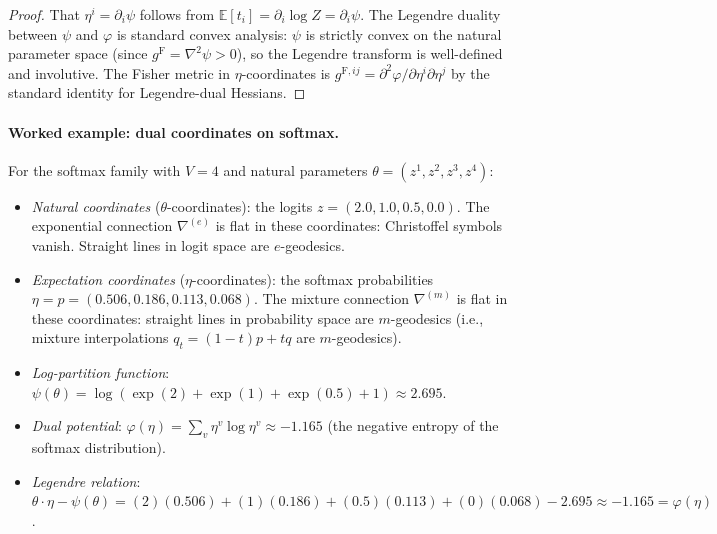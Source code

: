 \documentclass[11pt]{article}
\newcommand{\E}{\mathbb{E}}
\newcommand{\gF}{g^{\mathrm{F}}}
\theoremstyle{remark}
\begin{document}
\begin{proof}
That $\eta^i = \partial_i \psi$ follows from
$\E[t_i] = \partial_i \log Z = \partial_i \psi$.  The Legendre duality between
$\psi$ and $\varphi$ is standard convex analysis: $\psi$ is strictly convex
on the natural parameter space (since $\gF = \nabla^2 \psi > 0$), so the
Legendre transform is well-defined and involutive.  The Fisher metric in
$\eta$-coordinates is $g^{\mathrm{F},ij} = \partial^2 \varphi / \partial\eta^i
\partial\eta^j$ by the standard identity for Legendre-dual Hessians.
\end{proof}

\paragraph{Worked example: dual coordinates on softmax.}
For the softmax family with $V = 4$ and natural parameters
$\theta = (z^1, z^2, z^3, z^4)$:
\begin{itemize}[leftmargin=*]
  \item \emph{Natural coordinates} ($\theta$-coordinates):
  the logits $z = (2.0, 1.0, 0.5, 0.0)$.  The exponential connection
  $\nabla^{(e)}$ is flat in these coordinates: Christoffel symbols vanish.
  Straight lines in logit space are $e$-geodesics.

  \item \emph{Expectation coordinates} ($\eta$-coordinates):
  the softmax probabilities $\eta = p = (0.506, 0.186, 0.113, 0.068)$.  The
  mixture connection $\nabla^{(m)}$ is flat in these coordinates: straight
  lines in probability space are $m$-geodesics (i.e., mixture interpolations
  $q_t = (1-t)p + tq$ are $m$-geodesics).

  \item \emph{Log-partition function}:
  $\psi(\theta) = \log(\exp(2) + \exp(1) + \exp(0.5) + 1) \approx 2.695$.

  \item \emph{Dual potential}:
  $\varphi(\eta) = \sum_v \eta^v \log \eta^v \approx -1.165$ (the negative
  entropy of the softmax distribution).

  \item \emph{Legendre relation}:
  $\theta \cdot \eta - \psi(\theta) = (2)(0.506) + (1)(0.186) + (0.5)(0.113) +
  (0)(0.068) - 2.695 \approx -1.165 = \varphi(\eta)$. \checkmark
\end{itemize}
\end{document}
